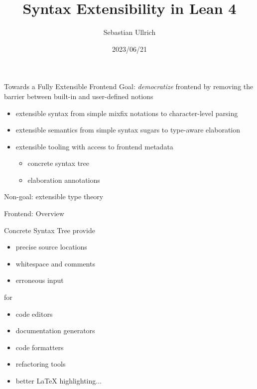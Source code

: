 \documentclass[en,t]{sdqbeamer}
\title{Syntax Extensibility in Lean 4}
\author[Ullrich]{Sebastian Ullrich}
\institute[IPD Snelting]{Programming paradigms group - IPD Snelting}
\date{2023/06/21}
\begin{document}
\KITtitleframe

\begin{frame}{Towards a Fully Extensible Frontend}
  Goal: \emph{democratize} frontend by removing the barrier between built-in and user-defined notions
  \begin{itemize}
    \pause
  \item extensible syntax from simple mixfix notations to character-level parsing
    \pause
  \item extensible semantics from simple syntax sugars to type-aware elaboration
    \pause
  \item extensible tooling with access to frontend metadata
    \begin{itemize}
    \item concrete syntax tree
    \item elaboration annotations
    \end{itemize}
  \end{itemize}
  \pause
  \bigskip
  Non-goal: extensible type theory
\end{frame}

\begin{frame}[fragile]{Frontend: Overview}
\end{frame}

\begin{frame}[fragile]{Concrete Syntax Tree}
  provide
  \begin{itemize}
  \item precise source locations
  \item whitespace and comments
  \item erroneous input
  \end{itemize}
  for
  \begin{itemize}
  \item code editors
  \item documentation generators
  \item code formatters
  \item refactoring tools
  \item better LaTeX highlighting...
  \end{itemize}
\end{frame}
\end{document}
